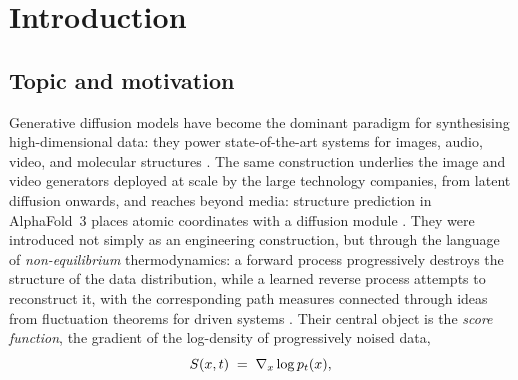 \chapter{Introduction}\label{ch:intro}

\section{Topic and motivation}

Generative diffusion models have become the dominant paradigm for
synthesising high-dimensional data: they power state-of-the-art systems
for images, audio, video, and molecular structures \citep{sohl2015deep,
ho2020denoising, song2021scorebased, karras2022elucidating}. The same
construction underlies the image and video generators deployed at scale by the
large technology companies, from latent diffusion \citep{rombach2022latent}
onwards, and reaches beyond media: structure prediction in AlphaFold~3 places
atomic coordinates with a diffusion module \citep{abramson2024alphafold3}. They were introduced not simply as an engineering construction, but through the language of \emph{non-equilibrium} thermodynamics: a forward process progressively destroys the structure of the data distribution, while a learned reverse process attempts to reconstruct it, with the corresponding path measures connected through ideas from fluctuation theorems for driven systems \citep{sohl2015deep}.
Their
central object is the \emph{score function}, the gradient of the
log-density of progressively noised data,
\begin{equation}
  S(x, t) \;=\; \nabla_x \log p_t(x),
  \label{eq:intro-score}
\end{equation}
